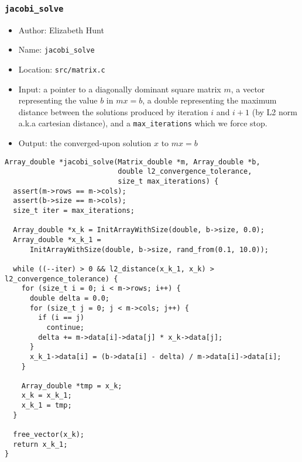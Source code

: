 \documentclass[11pt]{article}
\begin{document}
\subsubsection{\texttt{jacobi\_solve}}
\label{sec:org2cd6098}
\begin{itemize}
\item Author: Elizabeth Hunt
\item Name: \texttt{jacobi\_solve}
\item Location: \texttt{src/matrix.c}
\item Input: a pointer to a diagonally dominant square matrix \(m\), a vector representing
the value \(b\) in \(mx = b\), a double representing the maximum distance between
the solutions produced by iteration \(i\) and \(i+1\) (by L2 norm a.k.a cartesian
distance), and a \texttt{max\_iterations} which we force stop.
\item Output: the converged-upon solution \(x\) to \(mx = b\)
\end{itemize}
\begin{verbatim}
Array_double *jacobi_solve(Matrix_double *m, Array_double *b,
                           double l2_convergence_tolerance,
                           size_t max_iterations) {
  assert(m->rows == m->cols);
  assert(b->size == m->cols);
  size_t iter = max_iterations;

  Array_double *x_k = InitArrayWithSize(double, b->size, 0.0);
  Array_double *x_k_1 =
      InitArrayWithSize(double, b->size, rand_from(0.1, 10.0));

  while ((--iter) > 0 && l2_distance(x_k_1, x_k) > l2_convergence_tolerance) {
    for (size_t i = 0; i < m->rows; i++) {
      double delta = 0.0;
      for (size_t j = 0; j < m->cols; j++) {
        if (i == j)
          continue;
        delta += m->data[i]->data[j] * x_k->data[j];
      }
      x_k_1->data[i] = (b->data[i] - delta) / m->data[i]->data[i];
    }

    Array_double *tmp = x_k;
    x_k = x_k_1;
    x_k_1 = tmp;
  }

  free_vector(x_k);
  return x_k_1;
}
\end{verbatim}
\end{document}

